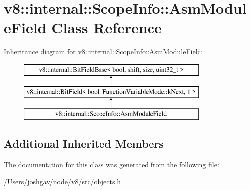 \hypertarget{classv8_1_1internal_1_1_scope_info_1_1_asm_module_field}{}\section{v8\+:\+:internal\+:\+:Scope\+Info\+:\+:Asm\+Module\+Field Class Reference}
\label{classv8_1_1internal_1_1_scope_info_1_1_asm_module_field}
Inheritance diagram for v8\+:\+:internal\+:\+:Scope\+Info\+:\+:Asm\+Module\+Field\+:\begin{figure}[H]
\begin{center}
\leavevmode
\includegraphics[height=3.000000cm]{classv8_1_1internal_1_1_scope_info_1_1_asm_module_field}
\end{center}
\end{figure}
\subsection*{Additional Inherited Members}


The documentation for this class was generated from the following file\+:\begin{DoxyCompactItemize}
\item 
/\+Users/joshgav/node/v8/src/objects.\+h\end{DoxyCompactItemize}
